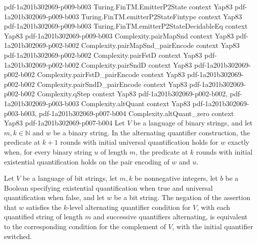\begin{theorem}
  {pdf-1a201b302069-p009-b003}
\proofstep
  {Turing.FinTM.EmitterP2State}
  {context}
  {Yap83}
  {pdf-1a201b302069-p009-b003}
\proofstep
  {Turing.FinTM.emitterP2StateFintype}
  {context}
  {Yap83}
  {pdf-1a201b302069-p009-b003}
\proofstep
  {Turing.FinTM.emitterP2StateDecidableEq}
  {context}
  {Yap83}
  {pdf-1a201b302069-p009-b003}
\proofstep
  {Complexity.pairMapSnd}
  {context}
  {Yap83}
  {pdf-1a201b302069-p002-b002}
\proofstep
  {Complexity.pairMapSnd_pairEncode}
  {context}
  {Yap83}
  {pdf-1a201b302069-p002-b002}
\proofstep
  {Complexity.pairFstD}
  {context}
  {Yap83}
  {pdf-1a201b302069-p002-b002}
\proofstep
  {Complexity.pairSndD}
  {context}
  {Yap83}
  {pdf-1a201b302069-p002-b002}
\proofstep
  {Complexity.pairFstD_pairEncode}
  {context}
  {Yap83}
  {pdf-1a201b302069-p002-b002}
\proofstep
  {Complexity.pairSndD_pairEncode}
  {context}
  {Yap83}
  {pdf-1a201b302069-p002-b002}
\proofstep
  {Complexity.qStep}
  {context}
  {Yap83}
  {pdf-1a201b302069-p002-b002,
    pdf-1a201b302069-p003-b003}
\proofstep
  {Complexity.altQuant}
  {context}
  {Yap83}
  {pdf-1a201b302069-p003-b003,
    pdf-1a201b302069-p007-b004}
\proofstep
  {Complexity.altQuant_zero}
  {context}
  {Yap83}
  {pdf-1a201b302069-p007-b004}
Let $V$ be a language of binary strings, and let $m,k\in\mathbb{N}$ and $w$ be a binary
string. In the alternating quantifier construction, the predicate at $k+1$ rounds with
initial universal quantification holds for $w$ exactly when, for every binary string $u$
of length $m$, the predicate at $k$ rounds with initial existential quantification holds
on the pair encoding of $w$ and $u$.
\end{theorem}

\begin{theorem}
\label{Complexity.not_altQuant}
\leanok
{}
Let $V$ be a language of bit strings, let $m,k$ be nonnegative integers, let $b$ be a
Boolean specifying existential quantification when true and universal quantification
when false, and let $w$ be a bit string. The negation of the assertion that $w$
satisfies the $k$-level alternating quantifier condition for $V$, with each quantified
string of length $m$ and successive quantifiers alternating, is equivalent to the
corresponding condition for the complement of $V$, with the initial quantifier switched.
\end{theorem}


